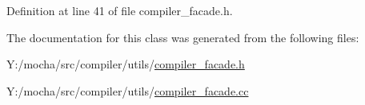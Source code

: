 Definition at line 41 of file compiler\_\-facade.h.



The documentation for this class was generated from the following files:\begin{DoxyCompactItemize}
\item 
Y:/mocha/src/compiler/utils/\hyperlink{compiler__facade_8h}{compiler\_\-facade.h}\item 
Y:/mocha/src/compiler/utils/\hyperlink{compiler__facade_8cc}{compiler\_\-facade.cc}\end{DoxyCompactItemize}
